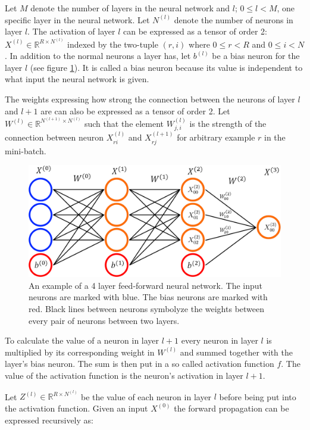 \documentclass[a4paper, twoside]{article}
\begin{document}
Let $M$ denote the number of layers in the neural network and $l$; $0 \leq l < M$, one specific layer in the neural network. Let $N^{(l)}$ denote the number of neurons in layer $l$. The activation of layer $l$ can be expressed as a tensor of order 2: $X^{(l)} \in \mathbb{R}^{R \times N^{(l)}}$ indexed by the two-tuple $(r,i)$ where $0 \leq r < R$ and $0 \leq i < N$. In addition to the normal neurons a layer has, let $b^{(l)}$ be a bias neuron for the layer $l$ (see figure \ref{figFCCmath}). It is called a bias neuron because its value is independent to what input the neural network is given. \cite{cs231n} \cite{wikiStanford}

The weights expressing how strong the connection between the neurons of layer $l$ and $l+1$ are can also be expressed as a tensor of order 2. Let $W^{(l)} \in \mathbb{R}^{N^{(l+1)}  \times N^{(l)}}$ such that the element $W_{j, i}^{(l)}$ is the strength of the connection between neuron $X_{ri}^{(l)}$ and $X_{rj}^{(l+1)}$ for arbitrary example $r$ in the mini-batch. \cite{cs231n} \cite{wikiStanford}

\begin{figure}[h]
	\centering
  		\includegraphics[scale=0.4]{FCC.png}
  	\caption{An example of a 4 layer feed-forward neural network. The input neurons are marked with blue. The bias neurons are marked with red. Black lines between neurons symbolyze the weights between every pair of neurons between two layers.} \label{figFCCmath}
\end{figure}

To calculate the value of a neuron in layer $l+1$ every neuron in layer $l$ is multiplied by its corresponding weight in $W^{(l)}$ and summed together with the layer's bias neuron. The sum is then put in a so called activation function $f$. The value of the activation function is the neuron's activation in layer $l+1$. \cite{cs231n} \cite{wikiStanford}

Let $Z^{(l)} \in \mathbb{R}^{R \times N^{(l)}}$ be the value of each neuron in layer $l$ before being put into the activation function. Given an input $X^{(0)}$ the forward propagation can be expressed recursively as: \cite{cs231n} \cite{wikiStanford}
\end{document}
